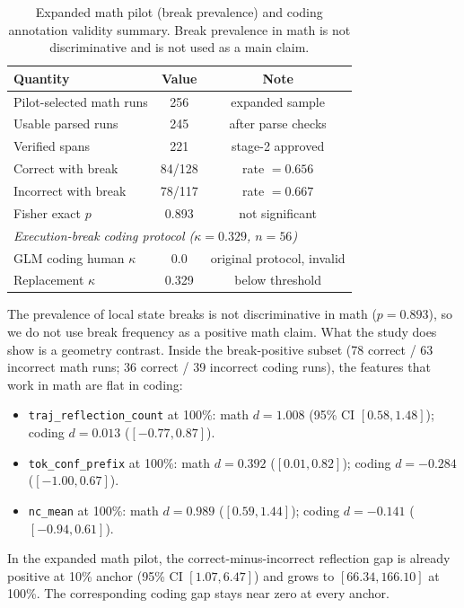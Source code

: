 \documentclass[10pt,twocolumn]{article}
\begin{document}
\begin{table}[t]
\centering
\small
\begin{tabular}{lcc}
\toprule
Quantity & Value & Note \\
\midrule
Pilot-selected math runs & 256 & expanded sample \\
Usable parsed runs & 245 & after parse checks \\
Verified spans & 221 & stage-2 approved \\
Correct with break & 84/128 & rate $= 0.656$ \\
Incorrect with break & 78/117 & rate $= 0.667$ \\
Fisher exact $p$ & 0.893 & not significant \\
\midrule
\multicolumn{3}{l}{\textit{Execution-break coding protocol ($\kappa = 0.329$, $n=56$)}} \\
GLM coding human $\kappa$ & 0.0 & original protocol, invalid \\
Replacement $\kappa$ & 0.329 & below threshold \\
\bottomrule
\end{tabular}
\caption{Expanded math pilot (break prevalence) and coding annotation validity summary. Break prevalence in math is not discriminative and is not used as a main claim.}
\label{tab:pilot}
\end{table}

The prevalence of local state breaks is not discriminative in math ($p = 0.893$), so we do not use break frequency as a positive math claim. What the study does show is a geometry contrast. Inside the break-positive subset (78 correct / 63 incorrect math runs; 36 correct / 39 incorrect coding runs), the features that work in math are flat in coding:
\begin{itemize}
\item \texttt{traj\_reflection\_count} at 100\%: math $d = 1.008$ (95\% CI $[0.58, 1.48]$); coding $d = 0.013$ ($[-0.77, 0.87]$).
\item \texttt{tok\_conf\_prefix} at 100\%: math $d = 0.392$ ($[0.01, 0.82]$); coding $d = -0.284$ ($[-1.00, 0.67]$).
\item \texttt{nc\_mean} at 100\%: math $d = 0.989$ ($[0.59, 1.44]$); coding $d = -0.141$ ($[-0.94, 0.61]$).
\end{itemize}
In the expanded math pilot, the correct-minus-incorrect reflection gap is already positive at 10\% anchor (95\% CI $[1.07, 6.47]$) and grows to $[66.34, 166.10]$ at 100\%. The corresponding coding gap stays near zero at every anchor.
\end{document}
